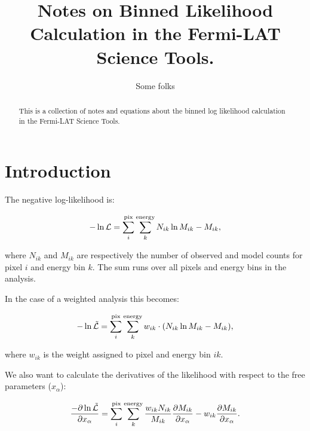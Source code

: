 \documentclass[preprint]{aastex}
\begin{document}
%
\title{Notes on Binned Likelihood Calculation in the Fermi-LAT Science Tools.}  

\author{ 
Some folks
}



\begin{abstract}
  This is a collection of notes and equations about the binned log likelihood calculation in the Fermi-LAT Science Tools.
\end{abstract}

\maketitle

\section{Introduction}

The negative log-likelihood is:

\begin{equation}
  - \ln \mathcal{L} = \sum_i^{\rm pix} \sum_k^{\rm energy}  N_{ik} \ln M_{ik} - M_{ik},
\end{equation}

\noindent where $N_{ik}$ and $M_{ik}$ are respectively the number of observed and model counts 
for pixel $i$ and energy bin $k$.  The sum runs over all pixels and energy bins in the analysis.

In the case of a weighted analysis this becomes:

\begin{equation}
  - \ln \tilde{\mathcal{L}} = \sum_i^{\rm pix} \sum_k^{\rm energy}  w_{ik} \cdot ( N_{ik} \ln M_{ik} - M_{ik} ),
\end{equation}

\noindent where $w_{ik}$ is the weight assigned to pixel and energy bin $ik$. 

We also want to calculate the derivatives of the likelihood with respect to the
free parameters ($x_{\alpha}$):

\begin{equation}
\frac{-\partial \ln \tilde{\mathcal{L}}}{\partial x_{\alpha}} = \sum_i^{\rm pix} \sum_k^{\rm energy} \frac{w_{ik} N_{ik}}{M_{ik}} \frac{\partial M_{ik}}{\partial x_{\alpha}} - w_{ik} \frac{\partial M_{ik}}{\partial x_{\alpha}}.
\end{equation}
\end{document}
